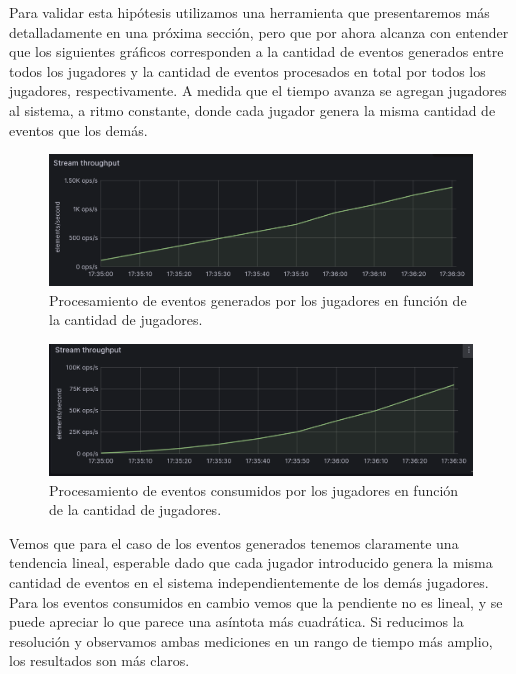 Para validar esta hipótesis utilizamos una herramienta que presentaremos más detalladamente en una próxima sección, pero que por ahora alcanza con entender que los siguientes gráficos corresponden a la cantidad de eventos generados entre todos los jugadores
y la cantidad de eventos procesados en total por todos los jugadores, respectivamente. A medida que el tiempo avanza se agregan jugadores al sistema, a ritmo constante, donde cada jugador genera la misma cantidad de eventos que los demás.

\begin{figure}[htbp]
    \centering
    \includegraphics[width=1\textwidth]{../assets/stream-producer-metrics.png}
    \caption{Procesamiento de eventos generados por los jugadores en función de la cantidad de jugadores.}
\end{figure}

\newpage

\begin{figure}[htbp]
    \centering
    \includegraphics[width=1\textwidth]{../assets/stream-consumer-metrics.png}
    \caption{Procesamiento de eventos consumidos por los jugadores en función de la cantidad de jugadores.}
\end{figure}

Vemos que para el caso de los eventos generados tenemos claramente una tendencia lineal, esperable dado que cada jugador introducido genera la misma cantidad de eventos en el sistema independientemente de los demás jugadores.
Para los eventos consumidos en cambio vemos que la pendiente no es lineal, y se puede apreciar lo que parece una asíntota más cuadrática. Si reducimos la resolución y observamos ambas mediciones en un rango de tiempo más amplio,
los resultados son más claros.

